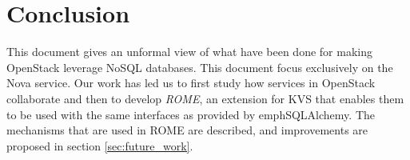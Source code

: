 \chapter{Conclusion}
\label{sec:conclusion}

This document gives an unformal view of what have been done for making OpenStack
leverage NoSQL databases. This document focus exclusively on the Nova service.
Our work has led us to first study how services in OpenStack collaborate and 
then to develop \emph{ROME}, an extension for KVS that enables
them to be used with the same interfaces as provided by emph{SQLAlchemy}. The
mechanisms that are used in ROME are described, and improvements are proposed in
section \ref{sec:future_work}.